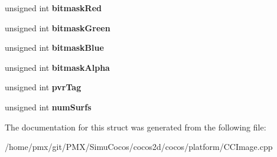 \begin{DoxyCompactItemize}
unsigned int {\bfseries bitmask\+Red}
\item 
\mbox{\label{structNS__CC__BEGIN_1_1__PVRTexHeader_a8b1146372e4ab8e9ad783ae82eae0b1c}} 
unsigned int {\bfseries bitmask\+Green}
\item 
\mbox{\label{structNS__CC__BEGIN_1_1__PVRTexHeader_ace6c8280e083a2c60fe38353858b4806}} 
unsigned int {\bfseries bitmask\+Blue}
\item 
\mbox{\label{structNS__CC__BEGIN_1_1__PVRTexHeader_a09180e682e303fd42b6e3df65db8a8c3}} 
unsigned int {\bfseries bitmask\+Alpha}
\item 
\mbox{\label{structNS__CC__BEGIN_1_1__PVRTexHeader_a6d12488b5b5af4a0a787641857c81547}} 
unsigned int {\bfseries pvr\+Tag}
\item 
\mbox{\label{structNS__CC__BEGIN_1_1__PVRTexHeader_aa133dbc36994f38dc15e27ed0e06b9fc}} 
unsigned int {\bfseries num\+Surfs}
\end{DoxyCompactItemize}


The documentation for this struct was generated from the following file\+:\begin{DoxyCompactItemize}
\item 
/home/pmx/git/\+P\+M\+X/\+Simu\+Cocos/cocos2d/cocos/platform/C\+C\+Image.\+cpp\end{DoxyCompactItemize}
